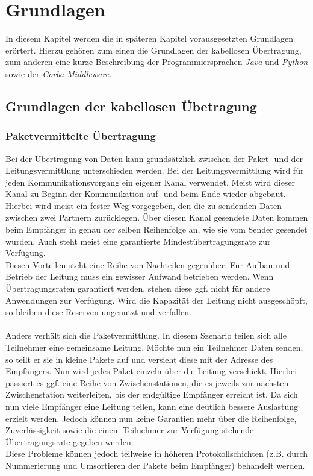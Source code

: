 
\chapter{Grundlagen}\label{Grundlagen}

In diesem Kapitel werden die in späteren Kapitel vorausgesetzten Grundlagen
erörtert. Hierzu gehören zum einen die Grundlagen der kabellosen Übertragung, zum anderen eine kurze Beschreibung der
Programmiersprachen \emph{Java} und \emph{Python} sowie der \emph{Corba-Middleware}. 

\section{Grundlagen der kabellosen Übetragung}
    \subsection{Paketvermittelte Übertragung}
        Bei der Übertragung von Daten kann grundsätzlich zwischen der Paket- und der Leitungsvermittlung unterschieden 
        werden. Bei der Leitungsvermittlung wird für jeden Kommunikationsvorgang ein eigener Kanal verwendet. 
        Meist wird dieser Kanal zu Beginn der Kommunikation auf- und beim Ende wieder abgebaut. Hierbei wird
        meist ein fester Weg vorgegeben, den die zu sendenden Daten zwischen zwei Partnern zurücklegen. Über diesen Kanal
        gesendete Daten kommen beim Empfänger in genau der selben Reihenfolge an, wie sie vom Sender gesendet wurden.
        Auch steht meist eine garantierte Mindestübertragungsrate zur Verfügung. \\
        Diesen Vorteilen steht eine Reihe von Nachteilen gegenüber. Für Aufbau und Betrieb der Leitung muss ein gewisser
        Aufwand betrieben werden. Wenn Übertragungsraten garantiert werden, stehen diese ggf. nicht für andere 
        Anwendungen zur Verfügung. Wird die Kapazität der Leitung nicht ausgeschöpft, so bleiben diese Reserven 
        ungenutzt und verfallen.\\
        \\
        Anders verhält sich die Paketvermittlung. In diesem Szenario teilen sich alle Teilnehmer eine gemeinsame
        Leitung. Möchte nun ein Teilnehmer Daten senden, so teilt er sie in kleine Pakete auf und versieht diese
        mit der Adresse des Empfängers. Nun wird jedes Paket einzeln über die Leitung verschickt. Hierbei passiert 
        es ggf. eine Reihe von Zwischenstationen, die es jeweils zur nächsten Zwischenstation weiterleiten, bis der
        endgültige Empfänger erreicht ist. Da sich nun viele Empfänger eine Leitung teilen, kann eine deutlich bessere
        Auslastung erzielt werden. Jedoch können nun keine Garantien mehr über die Reihenfolge, Zuverlässigkeit
        sowie die einem Teilnehmer zur Verfügung stehende Übertragungsrate gegeben werden.\\
        Diese Probleme können jedoch teilweise in höheren Protokollschichten (z.B. durch Nummerierung und Umsortieren 
        der Pakete beim Empfänger) behandelt werden.


